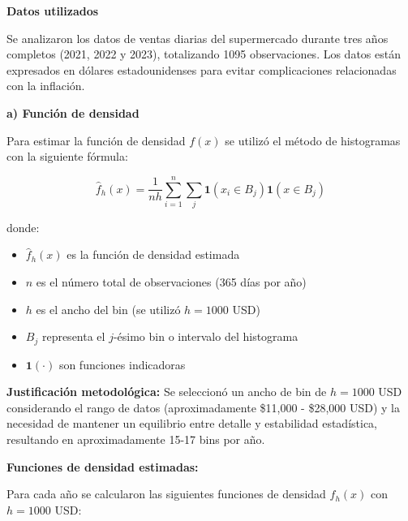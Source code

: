 \documentclass[11pt,a4paper]{article}
\begin{document}
\textbf{Datos utilizados}

Se analizaron los datos de ventas diarias del supermercado durante tres años completos (2021, 2022 y 2023), totalizando 1095 observaciones. Los datos están expresados en dólares estadounidenses para evitar complicaciones relacionadas con la inflación.

\textbf{a) Función de densidad}

Para estimar la función de densidad $f(x)$ se utilizó el método de histogramas con la siguiente fórmula:

\[
\hat{f}_h(x) = \frac{1}{nh} \sum_{i=1}^{n} \sum_{j} \mathbf{1}(x_i \in B_j) \mathbf{1}(x \in B_j)
\]

donde:
\begin{itemize}
    \item $\hat{f}_h(x)$ es la función de densidad estimada
    \item $n$ es el número total de observaciones (365 días por año)
    \item $h$ es el ancho del bin (se utilizó $h = 1000$ USD)
    \item $B_j$ representa el $j$-ésimo bin o intervalo del histograma
    \item $\mathbf{1}(\cdot)$ son funciones indicadoras
\end{itemize}

\textbf{Justificación metodológica:} Se seleccionó un ancho de bin de $h = 1000$ USD considerando el rango de datos (aproximadamente \$11,000 - \$28,000 USD) y la necesidad de mantener un equilibrio entre detalle y estabilidad estadística, resultando en aproximadamente 15-17 bins por año.

\textbf{Funciones de densidad estimadas:}

Para cada año se calcularon las siguientes funciones de densidad $\hat{f}_h(x)$ con $h = 1000$ USD:
\end{document}
